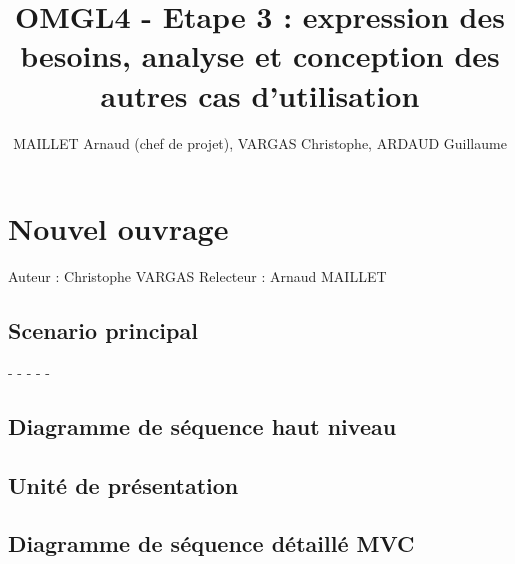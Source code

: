 \documentclass[a4paper,10pt]{report}
\title{OMGL4 - Etape 3 : expression des besoins, analyse et conception des autres cas d'utilisation}
\author{MAILLET Arnaud (chef de projet), VARGAS Christophe, ARDAUD Guillaume}
\begin{document}
\maketitle
\newpage
\null
\newpage
\tableofcontents
\newpage
\null
\newpage

\centering


\chapter*{Nouvel ouvrage}

Auteur : Christophe VARGAS
Relecteur : Arnaud MAILLET

\bigskip
\section*{Scenario principal}
\begin{flushleft}
-
-
-
-
-
\end{flushleft}

\bigskip

\section*{Diagramme de séquence haut niveau}

\newpage

\section*{Unité de présentation}

\section*{Diagramme de séquence détaillé MVC}

\newpage

\end{document}
